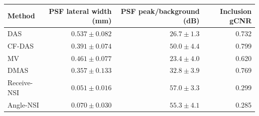 \begin{tabular}{@{}lrrr@{}}
\toprule
Method & PSF lateral width (mm) & PSF peak/background (dB) & Inclusion gCNR \\
\midrule
DAS & $0.537\pm0.082$ & $26.7\pm1.3$ & 0.732 \\
CF-DAS & $0.391\pm0.074$ & $50.0\pm4.4$ & 0.799 \\
MV & $0.461\pm0.077$ & $23.4\pm4.0$ & 0.620 \\
DMAS & $0.357\pm0.133$ & $32.8\pm3.9$ & 0.769 \\
Receive-NSI & $0.051\pm0.016$ & $57.0\pm3.3$ & 0.299 \\
Angle-NSI & $0.070\pm0.030$ & $55.3\pm4.1$ & 0.285 \\
\bottomrule
\end{tabular}

